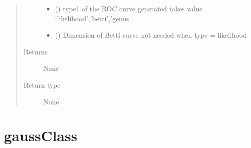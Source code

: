 \documentclass[letterpaper,10pt,english]{sphinxmanual}
\begin{document}
\begin{fulllineitems}
\begin{quote}
\begin{description}
\begin{itemize}
\item {} 
\sphinxAtStartPar
{} () \textendash{} type1 of the ROC curve generated takes value ‘likelihood’,’betti’,’genus

\item {} 
\sphinxAtStartPar
{} () \textendash{} Dimension of Betti curve not needed when type = likelihood

\end{itemize}

\item[{Returns}] \leavevmode
\sphinxAtStartPar
None

\item[{Return type}] \leavevmode
\sphinxAtStartPar
None

\end{description}\end{quote}

\end{fulllineitems}



\chapter{gaussClass}
\label{\detokenize{gaussClass:gaussclass}}\label{\detokenize{gaussClass:id1}}\label{\detokenize{gaussClass::doc}}\label{\detokenize{gaussClass:module-gaussClass}}
\end{document}
